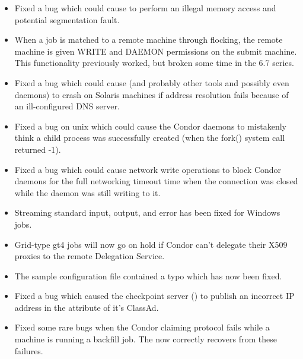\begin{itemize}
\item Fixed a bug which could cause  to perform an illegal
memory access and potential segmentation fault.

\item When a job is matched to a remote machine through flocking,
the remote machine is given WRITE and DAEMON permissions on the
submit machine.  This functionality previously worked, but broken
some time in the 6.7 series.

\item Fixed a bug which could cause  (and probably
other tools and possibly even daemons) to crash on Solaris machines
if address resolution fails because of an ill-configured DNS server.

\item Fixed a bug on unix which could cause the Condor daemons to mistakenly
think a child process was successfully created (when the fork() system
call returned -1).

\item Fixed a bug which could cause network write operations to block
Condor daemons for the full networking timeout time when the connection
was closed while the daemon was still writing to it.

\item Streaming standard input, output, and error has been fixed for
Windows jobs.

\item Grid-type gt4 jobs will now go on hold if Condor can't delegate
their X509 proxies to the remote Delegation Service.

\item The sample configuration file 
contained a typo which has now been fixed.

\item Fixed a bug which caused the checkpoint server
() to publish an incorrect IP address in the
 attribute of it's ClassAd.

\item Fixed some rare bugs when the Condor claiming protocol fails
  while a machine is running a backfill job.
  The  now correctly recovers from these failures.


\end{itemize}
